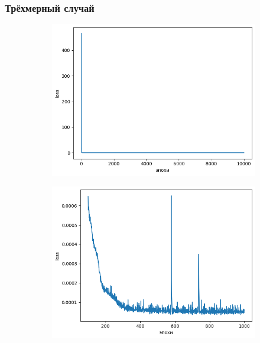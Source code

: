 \documentclass[t]{beamer}
\begin{document}
    \begin{frame}
        \frametitle{Трёхмерный случай}
        \begin{figure}[h]
            \begin{subfigure}{0.35\textwidth}
                \center
                \includegraphics[width=\textwidth]{../plots/ek/3-dim loss 20x4.png}
            \end{subfigure}
            \hfill
            \begin{subfigure}{0.35\textwidth}
                \center
                \includegraphics[width=\textwidth]{../plots/ek/3-dim loss trim20x4.png}

\end{subfigure}
\end{figure}
\end{frame}
\end{document}
